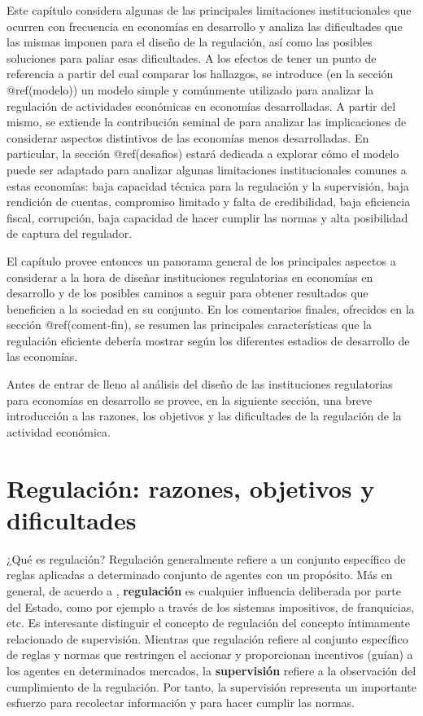 \documentclass[
  12pt,
  spanish,
]{book}
\begin{document}
Este capítulo considera algunas de las principales limitaciones
institucionales que ocurren con frecuencia en economías en desarrollo y
analiza las dificultades que las mismas imponen para el diseño de la
regulación, así como las posibles soluciones para paliar esas
dificultades. A los efectos de tener un punto de referencia a partir del
cual comparar los hallazgos, se introduce (en la sección @ref(modelo))
un modelo simple y comúnmente utilizado para analizar la regulación de
actividades económicas en economías desarrolladas. A partir del mismo,
se extiende la contribución seminal de \citet{Laffont2005} para analizar
las implicaciones de considerar aspectos distintivos de las economías
menos desarrolladas. En particular, la sección @ref(desafios) estará
dedicada a explorar cómo el modelo puede ser adaptado para analizar
algunas limitaciones institucionales comunes a estas economías: baja
capacidad técnica para la regulación y la supervisión, baja rendición de
cuentas, compromiso limitado y falta de credibilidad, baja eficiencia
fiscal, corrupción, baja capacidad de hacer cumplir las normas y alta
posibilidad de captura del regulador.

El capítulo provee entonces un panorama general de los principales
aspectos a considerar a la hora de diseñar instituciones regulatorias en
economías en desarrollo y de los posibles caminos a seguir para obtener
resultados que beneficien a la sociedad en su conjunto. En los
comentarios finales, ofrecidos en la sección @ref(coment-fin), se
resumen las principales características que la regulación eficiente
debería mostrar según los diferentes estadios de desarrollo de las
economías.

Antes de entrar de lleno al análisis del diseño de las instituciones
regulatorias para economías en desarrollo se provee, en la siguiente
sección, una breve introducción a las razones, los objetivos y las
dificultades de la regulación de la actividad económica.

\hypertarget{regulaciuxf3n-razones-objetivos-y-dificultades}{%
\section{Regulación: razones, objetivos y
dificultades}\label{regulaciuxf3n-razones-objetivos-y-dificultades}}

¿Qué es regulación? Regulación generalmente refiere a un conjunto
específico de reglas aplicadas a determinado conjunto de agentes con un
propósito. Más en general, de acuerdo a \citet{Baldwin2011},
\textbf{regulación} es cualquier influencia deliberada por parte del
Estado, como por ejemplo a través de los sistemas impositivos, de
franquicias, etc. Es interesante distinguir el concepto de regulación
del concepto íntimamente relacionado de supervisión. Mientras que
regulación refiere al conjunto específico de reglas y normas que
restringen el accionar y proporcionan incentivos (guían) a los agentes
en determinados mercados, la \textbf{supervisión} refiere a la
observación del cumplimiento de la regulación. Por tanto, la supervisión
representa un importante esfuerzo para recolectar información y para
hacer cumplir las normas.
\end{document}

